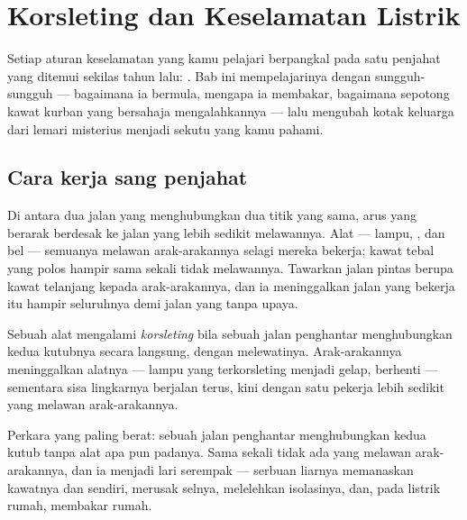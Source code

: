 \chapter{Korsleting dan Keselamatan Listrik}\label{ch:g7:short-circuits-safety}

Setiap aturan keselamatan yang kamu pelajari berpangkal pada satu
penjahat yang ditemui sekilas tahun lalu: . Bab ini
mempelajarinya dengan sungguh-sungguh --- bagaimana ia bermula,
mengapa ia membakar, bagaimana sepotong kawat kurban yang bersahaja
mengalahkannya --- lalu mengubah kotak  keluarga dari lemari
misterius menjadi sekutu yang kamu pahami.

\section{Cara kerja sang penjahat}

\begin{proposition}\label{prop:g7:short-circuits-safety:effortless}
Di antara dua jalan yang menghubungkan dua titik yang sama, arus yang
berarak berdesak ke jalan yang lebih sedikit melawannya. Alat ---
lampu, , dan bel --- semuanya melawan arak-arakannya selagi
mereka bekerja; kawat tebal yang polos hampir sama sekali tidak
melawannya.
Tawarkan jalan pintas berupa kawat telanjang kepada arak-arakannya,
dan ia meninggalkan jalan yang bekerja itu hampir seluruhnya demi
jalan yang tanpa upaya.
\end{proposition}

\begin{definition}\label{def:g7:short-circuits-safety:device}
Sebuah alat mengalami \emph{korsleting} bila sebuah
jalan penghantar menghubungkan kedua kutubnya secara langsung, dengan
melewatinya. Arak-arakannya meninggalkan alatnya --- lampu yang
terkorsleting menjadi gelap,  berhenti --- sementara sisa
lingkarnya berjalan terus, kini dengan satu pekerja lebih sedikit yang
melawan arak-arakannya.
\end{definition}

\begin{definition}\label{def:g7:short-circuits-safety:battery}
Perkara yang paling berat: sebuah jalan penghantar menghubungkan kedua
kutub \emph{} tanpa alat apa pun padanya. Sama sekali tidak
ada yang melawan arak-arakannya, dan ia menjadi lari serempak ---
serbuan liarnya memanaskan kawatnya dan  sendiri, merusak
selnya, melelehkan isolasinya, dan, pada listrik rumah, membakar rumah.
\end{definition}

